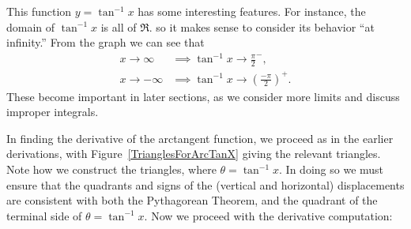 This function $y=\tan^{-1}x$ has some interesting features.  
For instance, the domain
of $\tan^{-1}x$ is all of $\Re$.
so it makes sense to consider its behavior
``at infinity.'' From the graph we can see that
\begin{align}
x\longrightarrow\infty&\implies \tan^{-1}x\longrightarrow{\frac{\pi}2}^-,\\
x\longrightarrow-\infty&\implies \tan^{-1}x\longrightarrow
\left({\frac{-\pi}2}\right)^+.\end{align}
These become important in later sections, as we consider
more limits and discuss improper integrals.

In finding the derivative of the arctangent function, we
proceed as in the earlier derivations, 
with Figure~\ref{TrianglesForArcTanX} giving the relevant 
triangles.  Note how we construct the triangles, where
$\theta=\tan^{-1}x$.  In doing so we must ensure that
the quadrants and signs of the (vertical and horizontal)
displacements are consistent
with both the Pythagorean Theorem, and the quadrant of the 
terminal side of $\theta=\tan^{-1}x$.
Now we proceed with the derivative computation:

